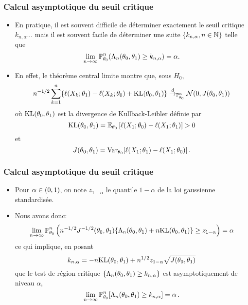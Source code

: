 \begin{frame}
\frametitle{Calcul asymptotique du seuil critique}
\begin{itemize}
\item En pratique, il est souvent difficile de déterminer exactement le seuil critique $k_{n,\alpha}$... mais il est souvent facile de déterminer
une suite $\{k_{n,\alpha}, n \in \mathbb{N}\}$ telle que
\[
\lim_{n \to \infty} \operatorname{{\mathbb P}}^n_{\theta_0} ( \Lambda_n(\theta_0,\theta_1) \geq  k_{n,\alpha}) = \alpha.
\]
\item En effet, le théorème central limite montre que, sous $H_0$,
\[
n^{-1/2} \sum_{k=1}^n \{ \ell(X_k; \theta_1) - \ell(X_k; \theta_0) + \mathrm{KL}(\theta_0,\theta_1) \} \stackrel{d}{\rightarrow}_{\operatorname{{\mathbb P}}^n_{\theta_0}} \mathcal{N}(0,J(\theta_0,\theta_1))
\]
où $\mathrm{KL}(\theta_0,\theta_1)$ est la \alert{divergence de Kullback-Leibler} définie par
\[
\mathrm{KL}(\theta_0,\theta_1) = \operatorname{{\mathbb E}}_{\theta_0}\left[ \ell(X_1;\theta_0) - \ell(X_1;\theta_1) \right] > 0
\]
et
\[
J(\theta_0,\theta_1)= \operatorname{\mathrm{Var}}_{\theta_0}[ \ell(X_1;\theta_1) - \ell(X_1;\theta_0) ] \,.
\]
\end{itemize}
\end{frame}

\begin{frame}
\frametitle{Calcul asymptotique du seuil critique}
\begin{itemize}
\item Pour $\alpha \in \left(0,1\right)$, on note $z_{1-\alpha}$ le quantile $1-\alpha$ de la loi gaussienne standardisée.
\item  Nous avons donc:
\[
\lim_{n \to \infty} \operatorname{{\mathbb P}}_{\theta_0}^n \left( n^{-1/2}
  J^{-1/2}(\theta_0,\theta_1) \{ \Lambda_n(\theta_0,\theta_1) +
  n \mathrm{KL}(\theta_0,\theta_1) \} \geq z_{1-\alpha} \right) = \alpha 
\]
ce qui implique, en posant
\[
k_{n,\alpha}= -n \mathrm{KL}(\theta_0,\theta_1) + n^{1/2} z_{1-\alpha} \sqrt{J(\theta_0,\theta_1)}
\]
que le test de région critique $\{ \Lambda_n(\theta_0,\theta_1) \geq
k_{n,\alpha} \}$ est asymptotiquement de niveau $\alpha$,
\[
\lim_{n \to \infty} \operatorname{{\mathbb P}}^n_{\theta_0} [ \Lambda_n(\theta_0,\theta_1)
\geq k_{n,\alpha} ] = \alpha \,.
\]
\end{itemize}
\end{frame}

